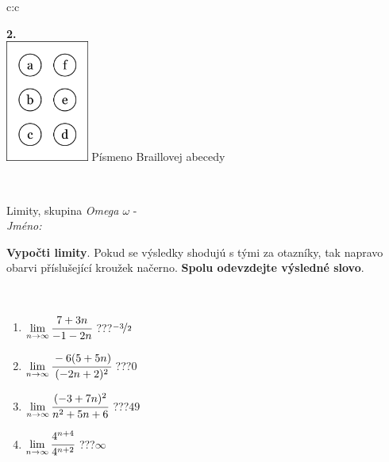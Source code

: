 \documentclass[10pt]{report}
\begin{document}
\begin{tabular}{c:c}
\begin{minipage}[c][104.5mm][t]{0.5\linewidth}
\begin{center}
\begin{minipage}{0.20\linewidth}
\begin{center}
{\Huge\bfseries 2.} \\[2mm]
\includegraphics[height=40mm]{../images/braille.png}
{\small Písmeno Braillovej abecedy}
\end{center}
\end{minipage}
\end{center}
\end{minipage}
\\ \hdashline
\begin{minipage}[c][104.5mm][t]{0.5\linewidth}
\begin{center}
\vspace{7mm}
{\huge Limity, skupina \textit{Omega $\omega$} -}\\[5mm]
\textit{Jméno:}\phantom{xxxxxxxxxxxxxxxxxxxxxxxxxxxxxxxxxxxxxxxxxxxxxxxxxxxxxxxxxxxxxxxxx}\\[5mm]
\begin{minipage}{0.95\linewidth}
\begin{center}
\textbf{Vypočti limity}. Pokud se výsledky shodujú s tými za otazníky, tak napravo\\obarvi příslušející kroužek načerno. \textbf{Spolu odevzdejte výsledné slovo}.
\end{center}
\end{minipage}
\\[1mm]
\begin{minipage}{0.79\linewidth}
\begin{center}
\begin{varwidth}{\linewidth}
\begin{enumerate}
\normalsize
\item $\lim\limits_{n\to\infty}\cfrac{7+3n}{-1-2n}$\quad \dotfill\; ???\;\dotfill \quad $\nicefrac{-3}{2}$
\item $\lim\limits_{n\to\infty}\cfrac{-6(5+5n)}{(-2n+2)^2}$\quad \dotfill\; ???\;\dotfill \quad $0$
\item $\lim\limits_{n\to\infty}\cfrac{(-3+7n)^2}{n^2+5n+6}$\quad \dotfill\; ???\;\dotfill \quad $49$
\item $\lim\limits_{n\to\infty}\cfrac{4^{n+4}}{4^{n+2}}$\quad \dotfill\; ???\;\dotfill \quad $\infty$

\end{enumerate}
\end{varwidth}
\end{center}
\end{minipage}
\end{center}
\end{minipage}
\end{tabular}
\end{document}
